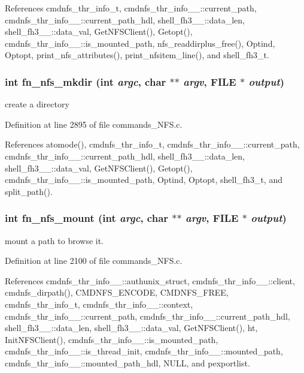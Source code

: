 References cmdnfs\_\-thr\_\-info\_\-t, cmdnfs\_\-thr\_\-info\_\-\_\-::current\_\-path, cmdnfs\_\-thr\_\-info\_\-\_\-::current\_\-path\_\-hdl, shell\_\-fh3\_\-\_\-::data\_\-len, shell\_\-fh3\_\-\_\-::data\_\-val, Get\-NFSClient(), Getopt(), cmdnfs\_\-thr\_\-info\_\-\_\-::is\_\-mounted\_\-path, nfs\_\-readdirplus\_\-free(), Optind, Optopt, print\_\-nfs\_\-attributes(), print\_\-nfsitem\_\-line(), and shell\_\-fh3\_\-t.
\subsubsection{\setlength{\rightskip}{0pt plus 5cm}int fn\_\-nfs\_\-mkdir (int {\em argc}, char $\ast$$\ast$ {\em argv}, FILE $\ast$ {\em output})}\label{commands_8h_a71}


create a directory 

Definition at line 2895 of file commands\_\-NFS.c.

References atomode(), cmdnfs\_\-thr\_\-info\_\-t, cmdnfs\_\-thr\_\-info\_\-\_\-::current\_\-path, cmdnfs\_\-thr\_\-info\_\-\_\-::current\_\-path\_\-hdl, shell\_\-fh3\_\-\_\-::data\_\-len, shell\_\-fh3\_\-\_\-::data\_\-val, Get\-NFSClient(), Getopt(), cmdnfs\_\-thr\_\-info\_\-\_\-::is\_\-mounted\_\-path, Optind, Optopt, shell\_\-fh3\_\-t, and split\_\-path().
\subsubsection{\setlength{\rightskip}{0pt plus 5cm}int fn\_\-nfs\_\-mount (int {\em argc}, char $\ast$$\ast$ {\em argv}, FILE $\ast$ {\em output})}\label{commands_8h_a67}


mount a path to browse it. 

Definition at line 2100 of file commands\_\-NFS.c.

References cmdnfs\_\-thr\_\-info\_\-\_\-::authunix\_\-struct, cmdnfs\_\-thr\_\-info\_\-\_\-::client, cmdnfs\_\-dirpath(), CMDNFS\_\-ENCODE, CMDNFS\_\-FREE, cmdnfs\_\-thr\_\-info\_\-t, cmdnfs\_\-thr\_\-info\_\-\_\-::context, cmdnfs\_\-thr\_\-info\_\-\_\-::current\_\-path, cmdnfs\_\-thr\_\-info\_\-\_\-::current\_\-path\_\-hdl, shell\_\-fh3\_\-\_\-::data\_\-len, shell\_\-fh3\_\-\_\-::data\_\-val, Get\-NFSClient(), ht, Init\-NFSClient(), cmdnfs\_\-thr\_\-info\_\-\_\-::is\_\-mounted\_\-path, cmdnfs\_\-thr\_\-info\_\-\_\-::is\_\-thread\_\-init, cmdnfs\_\-thr\_\-info\_\-\_\-::mounted\_\-path, cmdnfs\_\-thr\_\-info\_\-\_\-::mounted\_\-path\_\-hdl, NULL, and pexportlist.
